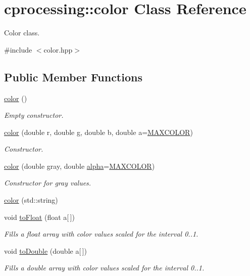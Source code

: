 \hypertarget{classcprocessing_1_1color}{\section{cprocessing\-:\-:color \-Class \-Reference}
\label{classcprocessing_1_1color}
}


\-Color class.  




{\ttfamily \#include $<$color.\-hpp$>$}

\subsection*{\-Public \-Member \-Functions}
\begin{DoxyCompactItemize}
\item 
\hyperlink{classcprocessing_1_1color_a6749dde98dcffcf7d50ea2fa30d316ab}{color} ()
\begin{DoxyCompactList}\small\item\em \-Empty constructor. \end{DoxyCompactList}\item 
\hyperlink{classcprocessing_1_1color_afe585293dac64c398d60d12489a701f4}{color} (double r, double g, double b, double a=\hyperlink{color_8hpp_acd61a23b73083918e86cc349ed38c076}{\-M\-A\-X\-C\-O\-L\-O\-R})
\begin{DoxyCompactList}\small\item\em \-Constructor. \end{DoxyCompactList}\item 
\hyperlink{classcprocessing_1_1color_a7b2a7d243ce51765690b4c33a530d6b3}{color} (double gray, double \hyperlink{classcprocessing_1_1color_a4b8d104207883515b224550dd402db49}{alpha}=\hyperlink{color_8hpp_acd61a23b73083918e86cc349ed38c076}{\-M\-A\-X\-C\-O\-L\-O\-R})
\begin{DoxyCompactList}\small\item\em \-Constructor for gray values. \end{DoxyCompactList}\item 
\hyperlink{classcprocessing_1_1color_acd5c6367bed9a385bef15d6d504d5ba5}{color} (std\-::string)
\item 
void \hyperlink{classcprocessing_1_1color_a971f2ecfc8d79eebb84e44e5f96050bf}{to\-Float} (float a\mbox{[}$\,$\mbox{]})
\begin{DoxyCompactList}\small\item\em \-Fills a float array with color values scaled for the interval 0..1. \end{DoxyCompactList}\item 
void \hyperlink{classcprocessing_1_1color_ac4087bc5858473590dedd5ad9d44fe09}{to\-Double} (double a\mbox{[}$\,$\mbox{]})
\begin{DoxyCompactList}\small\item\em \-Fills a double array with color values scaled for the interval 0..1. \end{DoxyCompactList}\end{DoxyCompactItemize}
